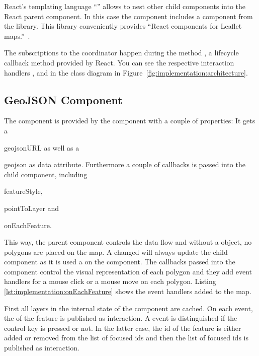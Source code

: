 React's templating language ``'' allows to nest other child components into the React parent component.
In this case the  component includes a   component from the  library.
This library conveniently provides ``React components for Leaflet maps.''~\parencite{ReactLeaflet2017}.

The subscriptions to the coordinator happen during the method , a lifecycle callback method provided by React.
You can see the respective interaction handlers ,  and  in the class diagram in Figure~\ref{fig:implementation:architecture}.


\subsection{GeoJSON Component}

The  component is provided by the  component with a couple of properties:
It gets a
\begin{enumerate*}[label=(\arabic*)]
  \item
    geojsonURL as well as a
  \item
    geojson as data attribute. Furthermore a couple of callbacks is passed into the child component, including
  \item
    featureStyle,
  \item
    pointToLayer and
  \item
    onEachFeature.
\end{enumerate*}

This way, the parent  component controls the data flow and without a  object, no polygons are placed on the map.
A changed  will always update the child component as it is used a  on the  component.
The callbacks passed into the  component control the visual representation of each polygon and they add event handlers for a mouse click or a mouse move on each polygon.
Listing \ref{lst:implementation:onEachFeature} shows the event handlers added to the map.



First all layers in the internal state of the  component are cached.
On each  event, the  of the feature is published as  interaction.
A  event is distinguished if the control key is pressed or not.
In the latter case, the id of the feature is either added or removed from the list of focused ids and then the list of focused ids is published as  interaction.

